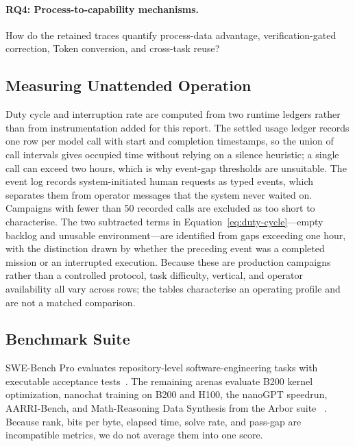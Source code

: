 \paragraph{RQ4: Process-to-capability mechanisms.}
How do the retained traces quantify process-data advantage, verification-gated
correction, Token conversion, and cross-task reuse?

\subsection{Measuring Unattended Operation}

Duty cycle and interruption rate are computed from two runtime ledgers rather than
from instrumentation added for this report. The settled usage ledger records one row
per model call with start and completion timestamps, so the union of call intervals
gives occupied time without relying on a silence heuristic; a single call can exceed
two hours, which is why event-gap thresholds are unsuitable. The event log records
system-initiated human requests as typed events, which separates them from operator
messages that the system never waited on. Campaigns with fewer than 50 recorded calls
are excluded as too short to characterise. The two subtracted terms in
Equation~\ref{eq:duty-cycle}---empty backlog and unusable environment---are
identified from gaps exceeding one hour, with the distinction drawn by whether the
preceding event was a completed mission or an interrupted execution. Because these
are production campaigns rather than a controlled protocol, task difficulty, vertical,
and operator availability all vary across rows; the tables characterise an operating
profile and are not a matched comparison.

\subsection{Benchmark Suite}

SWE-Bench Pro evaluates repository-level software-engineering tasks with executable
acceptance tests~\citep{deng2025swebenchpro}. The remaining arenas evaluate B200
kernel optimization, nanochat training on B200 and H100, the nanoGPT speedrun,
AARRI-Bench, and Math-Reasoning Data Synthesis from the Arbor suite
~\citep{lin2026solexecbench,karpathy_nanochat,karpathy_autoresearch,
jordan_nanogptbench,wang2026aarri,jin2026arbor}. Because rank, bits per byte,
elapsed time, solve rate, and pass-gap are incompatible metrics, we do not average
them into one score.

